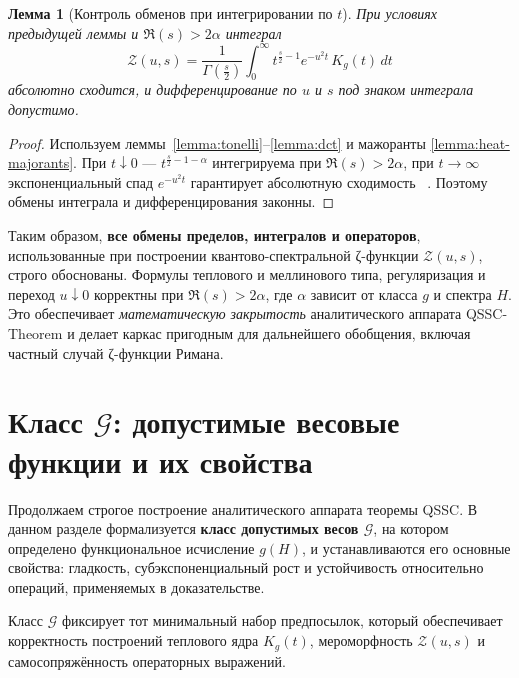 \documentclass{article}
\numberwithin{equation}{section}
\theoremstyle{plain}
\newtheorem{lemma}{Лемма}
\theoremstyle{definition}
\theoremstyle{remark}
\def\alpha{α}\def\beta{β}\def\gamma{γ}\def\Gamma{Γ}%
\def\infty{∞}\def\partial{∂}\def\sum{Σ}\def\int{∫}%
\begin{document}
\begin{lemma}[Контроль обменов при интегрировании по $t$]
\label{lemma:heat-integral-exchange}
При условиях предыдущей леммы и $\Re(s)>2\alpha$ интеграл
\begin{equation}
\mathcal Z(u,s) = \frac{1}{\Gamma\!\left(\frac s2\right)} 
\int_0^\infty t^{\frac s2-1}e^{-u^2t}\,K_g(t)\,dt
\end{equation}
абсолютно сходится, и дифференцирование по $u$ и $s$ под знаком интеграла допустимо.
\end{lemma}

\begin{proof}
Используем леммы~\ref{lemma:tonelli}–\ref{lemma:dct} и мажоранты \ref{lemma:heat-majorants}.  
При $t\downarrow0$ — $t^{\frac s2-1-\alpha}$ интегрируема при $\Re(s)>2\alpha$,  
при $t\to\infty$ экспоненциальный спад $e^{-u^2t}$ гарантирует абсолютную сходимость ~\cite{Widder1941}.  
Поэтому обмены интеграла и дифференцирования законны. 
\end{proof}

\noindent
Таким образом, \textbf{все обмены пределов, интегралов и операторов}, 
использованные при построении квантово-спектральной ζ-функции $\mathcal Z(u,s)$,
строго обоснованы.  
Формулы теплового и меллинового типа, регуляризация и переход $u\downarrow0$
корректны при $\Re(s)>2\alpha$, где $\alpha$ зависит от класса $g$ и спектра $H$.  
Это обеспечивает \emph{математическую закрытость} аналитического аппарата QSSC-Theorem
и делает каркас пригодным для дальнейшего обобщения, включая частный случай ζ-функции Римана.

\clearpage

\section{Класс $\mathcal G$: допустимые весовые функции и их свойства}

\noindent
Продолжаем строгое построение аналитического аппарата теоремы QSSC.
В данном разделе формализуется \textbf{класс допустимых весов $\mathcal G$}, 
на котором определено функциональное исчисление $g(H)$, 
и устанавливаются его основные свойства: гладкость, субэкспоненциальный рост и устойчивость относительно операций, применяемых в доказательстве.

Класс $\mathcal G$ фиксирует тот минимальный набор предпосылок, 
который обеспечивает корректность построений теплового ядра $K_g(t)$, 
мероморфность $\mathcal Z(u,s)$ и самосопряжённость операторных выражений.
\end{document}
